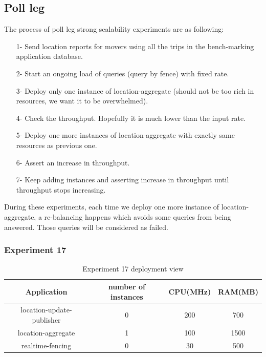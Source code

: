 \documentclass[a4]{report}
\begin{document}
    \subsection{Poll leg}
    The process of poll leg strong scalability experiments are as following:
    \begin{itemize}
        \item[1-] Send location reports for movers using all the trips in the bench-marking application database.
        \item[2-] Start an ongoing load of queries (query by fence) with fixed rate.
        \item[3-] Deploy only one instance of location-aggregate (should not be too rich in resources, we want it to be
        overwhelmed).
        \item[4-] Check the throughput. Hopefully it is much lower than the input rate.
        \item[5-] Deploy one more instances of location-aggregate with exactly same resources as previous one.
        \item[6-] Assert an increase in throughput.
        \item[7-] Keep adding instances and asserting increase in throughput until throughput stops increasing.
    \end{itemize}

    During these experiments, each time we deploy one more instance of location-aggregate, a re-balancing happens which
    avoids some queries from being answered.
    Those queries will be considered as failed.

    \clearpage

    \subsubsection{Experiment 17}
    \begin{table}[h!]
        \centering
        \begin{tabular}{|c|c|c|c|}
            \hline
            Application               & number of instances & CPU(MHz) & RAM(MB) \\
            \hline
            location-update-publisher & 0                   & 200      & 700     \\
            location-aggregate        & 1                   & 100      & 1500    \\
            realtime-fencing          & 0                   & 30       & 500     \\
            \hline
        \end{tabular}
        \caption{Experiment 17 deployment view}
        \label{table:ex17-dv}
    \end{table}
\end{document}
